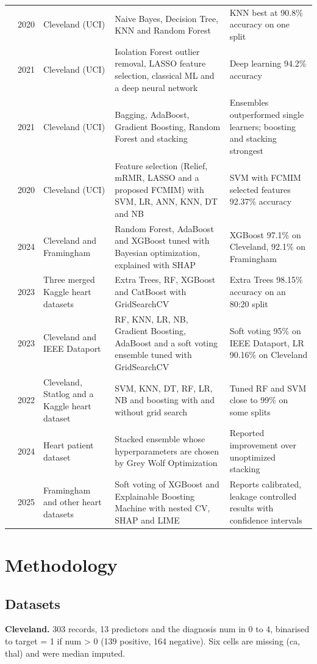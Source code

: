 \documentclass[conference,a4paper,10pt]{IEEEtran}
\begin{document}
\begin{table}[!t]
\begin{tabular}
{}\cite{r12} & 2020 & Cleveland (UCI) & Naive Bayes, Decision Tree, KNN and Random Forest & KNN best at 90.8\% accuracy on one split \\
{}\cite{r13} & 2021 & Cleveland (UCI) & Isolation Forest outlier removal, LASSO feature selection, classical ML and a deep neural network & Deep learning 94.2\% accuracy \\
{}\cite{r14} & 2021 & Cleveland (UCI) & Bagging, AdaBoost, Gradient Boosting, Random Forest and stacking & Ensembles outperformed single learners; boosting and stacking strongest \\
{}\cite{r15} & 2020 & Cleveland (UCI) & Feature selection (Relief, mRMR, LASSO and a proposed FCMIM) with SVM, LR, ANN, KNN, DT and NB & SVM with FCMIM selected features 92.37\% accuracy \\
{}\cite{r16} & 2024 & Cleveland and Framingham & Random Forest, AdaBoost and XGBoost tuned with Bayesian optimization, explained with SHAP & XGBoost 97.1\% on Cleveland, 92.1\% on Framingham \\
{}\cite{r17} & 2023 & Three merged Kaggle heart datasets & Extra Trees, RF, XGBoost and CatBoost with GridSearchCV & Extra Trees 98.15\% accuracy on an 80:20 split \\
{}\cite{r18} & 2023 & Cleveland and IEEE Dataport & RF, KNN, LR, NB, Gradient Boosting, AdaBoost and a soft voting ensemble tuned with GridSearchCV & Soft voting 95\% on IEEE Dataport, LR 90.16\% on Cleveland \\
{}\cite{r19} & 2022 & Cleveland, Statlog and a Kaggle heart dataset & SVM, KNN, DT, RF, LR, NB and boosting with and without grid search & Tuned RF and SVM close to 99\% on some splits \\
{}\cite{r20} & 2024 & Heart patient dataset & Stacked ensemble whose hyperparameters are chosen by Grey Wolf Optimization & Reported improvement over unoptimized stacking \\
{}\cite{r21} & 2025 & Framingham and other heart datasets & Soft voting of XGBoost and Explainable Boosting Machine with nested CV, SHAP and LIME & Reports calibrated, leakage controlled results with confidence intervals \\
\hline
\end{tabular}
\end{table}

\section{Methodology}
\subsection{Datasets}
\textbf{Cleveland.} 303 records, 13 predictors and the diagnosis num in 0 to 4, binarised to target = 1 if num \textgreater{} 0 (139 positive, 164 negative). Six cells are missing (ca, thal) and were median imputed.
\end{document}

